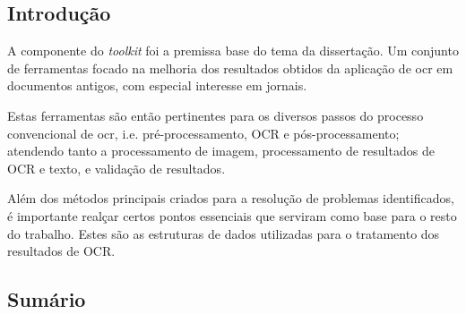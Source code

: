 \subsection{Introdução}

A componente do \textit{toolkit} foi a premissa base do tema da dissertação. Um conjunto de ferramentas focado na melhoria dos resultados obtidos da aplicação de \acrshort{ocr} em documentos antigos, com especial interesse em jornais. 

Estas ferramentas são então pertinentes para os diversos passos do processo convencional de \acrshort{ocr}, i.e. pré-processamento, OCR e pós-processamento; atendendo tanto a processamento de imagem, processamento de resultados de OCR e texto, e validação de resultados.

Além dos métodos principais criados para a resolução de problemas identificados, é importante realçar certos pontos essenciais que serviram como base para o resto do trabalho. Estes são as estruturas de dados utilizadas para o tratamento dos resultados de OCR.

\subsection{Sumário}

